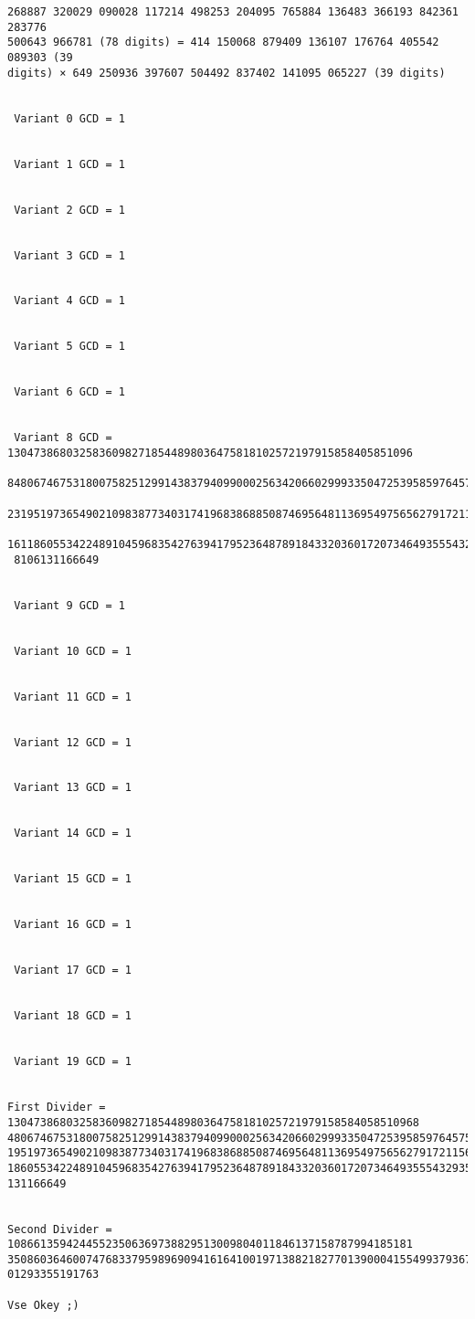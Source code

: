 \documentclass[12pt]{article}
\begin{document}
\begin{verbatim}
268887 320029 090028 117214 498253 204095 765884 136483 366193 842361 283776
500643 966781 (78 digits) = 414 150068 879409 136107 176764 405542 089303 (39
digits) × 649 250936 397607 504492 837402 141095 065227 (39 digits)


 Variant 0 GCD = 1


 Variant 1 GCD = 1


 Variant 2 GCD = 1


 Variant 3 GCD = 1


 Variant 4 GCD = 1


 Variant 5 GCD = 1


 Variant 6 GCD = 1


 Variant 8 GCD = 13047386803258360982718544898036475818102572197915858405851096
 848067467531800758251299143837940990002563420660299933504725395859764575192257
 231951973654902109838773403174196838688508746956481136954975656279172115606067
 161186055342248910459683542763941795236487891843320360172073464935554329358004
 8106131166649


 Variant 9 GCD = 1


 Variant 10 GCD = 1


 Variant 11 GCD = 1


 Variant 12 GCD = 1


 Variant 13 GCD = 1


 Variant 14 GCD = 1


 Variant 15 GCD = 1


 Variant 16 GCD = 1


 Variant 17 GCD = 1


 Variant 18 GCD = 1


 Variant 19 GCD = 1


First Divider = 130473868032583609827185448980364758181025721979158584058510968
4806746753180075825129914383794099000256342066029993350472539585976457519225723
1951973654902109838773403174196838688508746956481136954975656279172115606067161
1860553422489104596835427639417952364878918433203601720734649355543293580048106
131166649


Second Divider = 10866135942445523506369738829513009804011846137158787994185181
3508603646007476833795989690941616410019713882182770139000415549937936708389778
01293355191763

Vse Okey ;)

\end{verbatim}

\newpage
\end{document}
